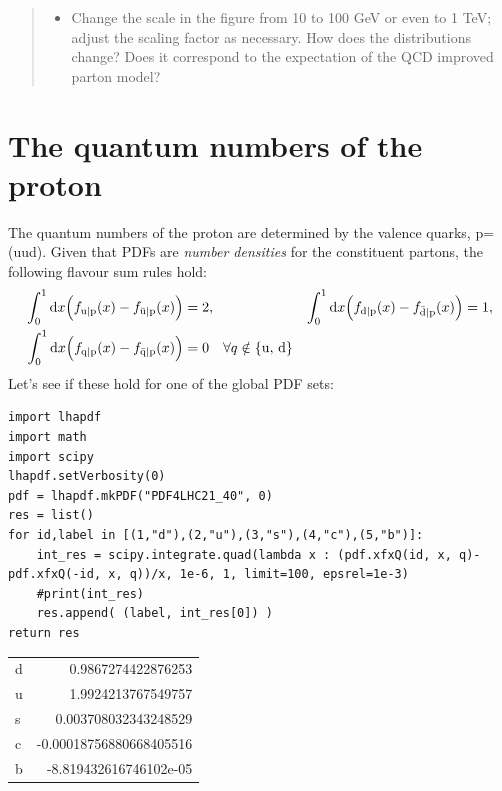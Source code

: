 \documentclass[11pt]{article}
\begin{document}
\begin{quote}
\begin{itemize}
\item Change the scale in the figure from 10 to 100 GeV or even to 1 TeV; adjust the scaling factor as necessary.
How does the distributions change?
Does it correspond to the expectation of the QCD improved parton model?
\end{itemize}
\end{quote}
\section{The quantum numbers of the proton}
\label{sec:org14eb722}
The quantum numbers of the proton are determined by the valence quarks, p=(uud).
Given that PDFs are \emph{number densities} for the constituent partons, the following flavour sum rules hold:
\begin{align}
  \int_0^1\mathrm{d}x \Bigl(
    f_{\mathrm{u}\vert\mathrm{p}}(x)
  - f_{\bar{\mathrm{u}}\vert\mathrm{p}}(x)
  \Bigr)
  &= 2, &
  \int_0^1\mathrm{d}x \Bigl(
    f_{\mathrm{d}\vert\mathrm{p}}(x)
  - f_{\bar{\mathrm{d}}\vert\mathrm{p}}(x)
  \Bigr)
  &= 1,
  \\
  \int_0^1\mathrm{d}x \Bigl(
    f_{\mathrm{q}\vert\mathrm{p}}(x)
  - f_{\bar{\mathrm{q}}\vert\mathrm{p}}(x)
  \Bigr)
  &= 0 \quad \forall q \notin \{\mathrm{u},\,\mathrm{d}\}
\end{align}
Let's see if these hold for one of the global PDF sets:
\begin{verbatim}
import lhapdf
import math
import scipy
lhapdf.setVerbosity(0)
pdf = lhapdf.mkPDF("PDF4LHC21_40", 0)
res = list()
for id,label in [(1,"d"),(2,"u"),(3,"s"),(4,"c"),(5,"b")]:
    int_res = scipy.integrate.quad(lambda x : (pdf.xfxQ(id, x, q)-pdf.xfxQ(-id, x, q))/x, 1e-6, 1, limit=100, epsrel=1e-3)
    #print(int_res)
    res.append( (label, int_res[0]) )
return res
\end{verbatim}

\begin{table}[htbp]
\label{}
\centering
\begin{tabular}{lr}
d & 0.9867274422876253\\
u & 1.9924213767549757\\
s & 0.003708032343248529\\
c & -0.00018756880668405516\\
b & -8.819432616746102e-05\\
\end{tabular}
\end{table}
\end{document}
